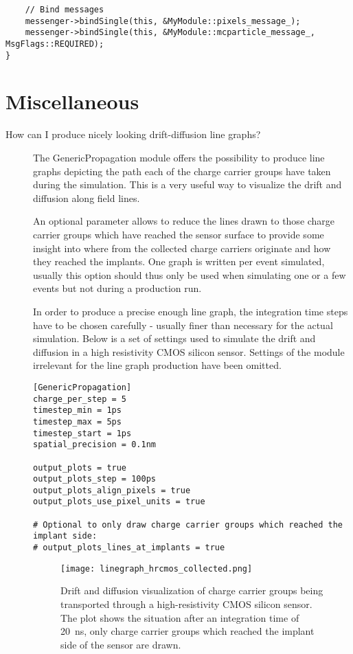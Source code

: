 \begin{description}
\begin{verbatim}
    // Bind messages
    messenger->bindSingle(this, &MyModule::pixels_message_);
    messenger->bindSingle(this, &MyModule::mcparticle_message_, MsgFlags::REQUIRED);
}
\end{verbatim}
\end{description}

\section{Miscellaneous}
\begin{description}
\item[How can I produce nicely looking drift-diffusion line graphs?]
The GenericPropagation module offers the possibility to produce line graphs depicting the path each of the charge carrier groups have taken during the simulation. This is a very useful way to visualize the drift and diffusion along field lines.

An optional parameter allows to reduce the lines drawn to those charge carrier groups which have reached the sensor surface to provide some insight into where from the collected charge carriers originate and how they reached the implants.
One graph is written per event simulated, usually this option should thus only be used when simulating one or a few events but not during a production run.

In order to produce a precise enough line graph, the integration time steps have to be chosen carefully - usually finer than necessary for the actual simulation. Below is a set of settings used to simulate the drift and diffusion in a high resistivity CMOS silicon sensor.
Settings of the module irrelevant for the line graph production have been omitted.

\begin{verbatim}
[GenericPropagation]
charge_per_step = 5
timestep_min = 1ps
timestep_max = 5ps
timestep_start = 1ps
spatial_precision = 0.1nm

output_plots = true
output_plots_step = 100ps
output_plots_align_pixels = true
output_plots_use_pixel_units = true

# Optional to only draw charge carrier groups which reached the implant side:
# output_plots_lines_at_implants = true
\end{verbatim}

\begin{figure}[tbp]
    \centering
  \texttt{[image: linegraph\_hrcmos\_collected.png]}
  \caption{Drift and diffusion visualization of charge carrier groups being transported through a high-resistivity CMOS silicon sensor. The plot shows the situation after an integration time of \SI{20}{\nano \second}, only charge carrier groups which reached the implant side of the sensor are drawn.}
  \label{fig:linegraph}
\end{figure}


\end{description}
